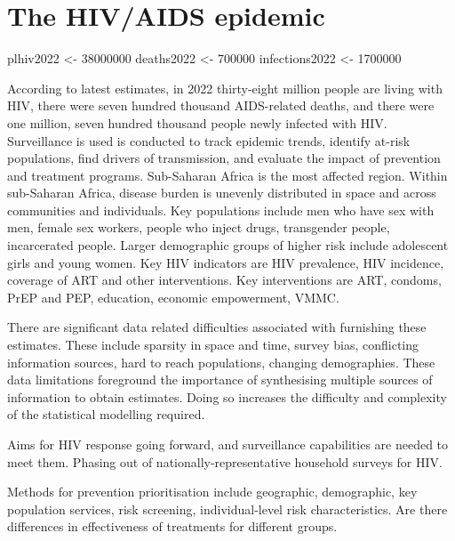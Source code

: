 \documentclass[a4paper, nobind]{templates/ociamthesis}
\newenvironment{Shaded}{\begin{snugshade}}{\end{snugshade}}
\newcommand{\DecValTok}[1]{\textcolor[rgb]{0.00,0.00,0.81}{#1}}
\newcommand{\NormalTok}[1]{#1}
\newcommand{\OtherTok}[1]{\textcolor[rgb]{0.56,0.35,0.01}{#1}}
\renewenvironment{Shaded}
{
  \vspace{10pt}%
  \begin{snugshade}%
}{%
  \end{snugshade}%
  \vspace{8pt}%
}
\begin{document}
\hypertarget{the-hivaids-epidemic}{%
\section{The HIV/AIDS epidemic}\label{the-hivaids-epidemic}}

\begin{Shaded}
\begin{Highlighting}[]
\NormalTok{plhiv2022 }\OtherTok{\textless{}{-}} \DecValTok{38000000}
\NormalTok{deaths2022 }\OtherTok{\textless{}{-}} \DecValTok{700000}
\NormalTok{infections2022 }\OtherTok{\textless{}{-}} \DecValTok{1700000}
\end{Highlighting}
\end{Shaded}

According to latest estimates, in 2022 thirty-eight million people are living with HIV, there were seven hundred thousand AIDS-related deaths, and there were one million, seven hundred thousand people newly infected with HIV.
Surveillance is used is conducted to track epidemic trends, identify at-risk populations, find drivers of transmission, and evaluate the impact of prevention and treatment programs.
Sub-Saharan Africa is the most affected region.
Within sub-Saharan Africa, disease burden is unevenly distributed in space and across communities and individuals.
Key populations include men who have sex with men, female sex workers, people who inject drugs, transgender people, incarcerated people.
Larger demographic groups of higher risk include adolescent girls and young women.
Key HIV indicators are HIV prevalence, HIV incidence, coverage of ART and other interventions.
Key interventions are ART, condoms, PrEP and PEP, education, economic empowerment, VMMC.

There are significant data related difficulties associated with furnishing these estimates.
These include sparsity in space and time, survey bias, conflicting information sources, hard to reach populations, changing demographies.
These data limitations foreground the importance of synthesising multiple sources of information to obtain estimates.
Doing so increases the difficulty and complexity of the statistical modelling required.

Aims for HIV response going forward, and surveillance capabilities are needed to meet them.
Phasing out of nationally-representative household surveys for HIV.

Methods for prevention prioritisation include geographic, demographic, key population services, risk screening, individual-level risk characteristics.
Are there differences in effectiveness of treatments for different groups.
\end{document}
